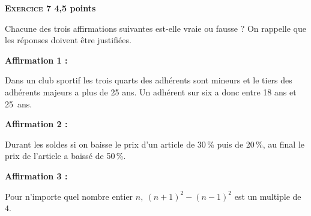\documentclass[10pt]{article}
\begin{document}
\bigskip

\textbf{\textsc{Exercice} 7 \hfill 4,5 points}

\medskip 
 
Chacune des trois affirmations suivantes est-elle vraie ou fausse ? On rappelle que les réponses doivent être justifiées.

\medskip
 
\textbf{Affirmation 1 :}
 
Dans un club sportif les trois quarts des adhérents sont mineurs et le tiers des adhérents majeurs a plus de 25 ans. Un adhérent sur six a donc entre 18 ans et 25~ans.

\medskip
 
\textbf{Affirmation 2 :}
 
Durant les soldes si on baisse le prix d'un article de 30\,\% puis de 20\,\%, au final le prix de l'article a baissé de 50\,\%.

\medskip
 
\textbf{Affirmation 3 :}
 
Pour n'importe quel nombre entier $n,\: (n + 1)^2 - (n - 1)^2$ est un multiple de $4$.
\end{document}

